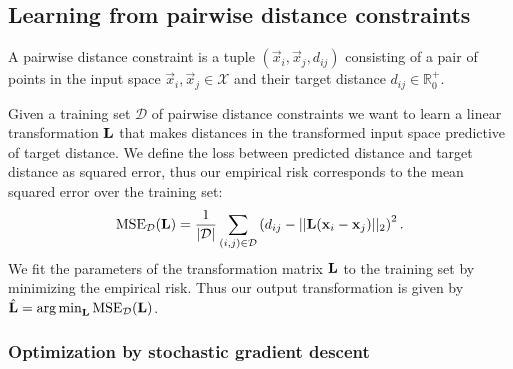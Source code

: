 
\subsection{Learning from pairwise distance constraints}


A pairwise distance constraint is a tuple $(\vec{x}_i, \vec{x}_j, d_{ij})$ consisting of a pair of points in the input space $\vec{x}_i, \vec{x}_j \in \mathcal{X}$ and their target distance $d_{ij} \in \mathbb{R}_0^+$. 

Given a training set $\mathcal{D}$ of pairwise distance constraints we want to learn a linear transformation $\mathbf{L}$ that makes distances in the transformed input space predictive of target distance. We define the loss between predicted distance and target distance as squared error, thus our empirical risk corresponds to the mean squared error over the training set:
\begin{equation}
\text{MSE}_\mathcal{D}(\mathbf{L}) = \frac{1}{|\mathcal{D}|}\sum_{(i,j) \in \mathcal{D}} \left ( d_{ij} - ||\mathbf{L} (\mathbf{x}_i - \mathbf{x}_j)||_2 \right)^2.
\label{eq:mse}
\end{equation}
We fit the parameters of the transformation matrix $\mathbf{L}$ to the training set by minimizing the empirical risk. Thus our output transformation is given by $\hat{\mathbf{L}} = \operatorname*{arg\,min}_{\mathbf{L}} \text{MSE}_\mathcal{D}(\mathbf{L})$. 

\subsubsection{Optimization by stochastic gradient descent}


